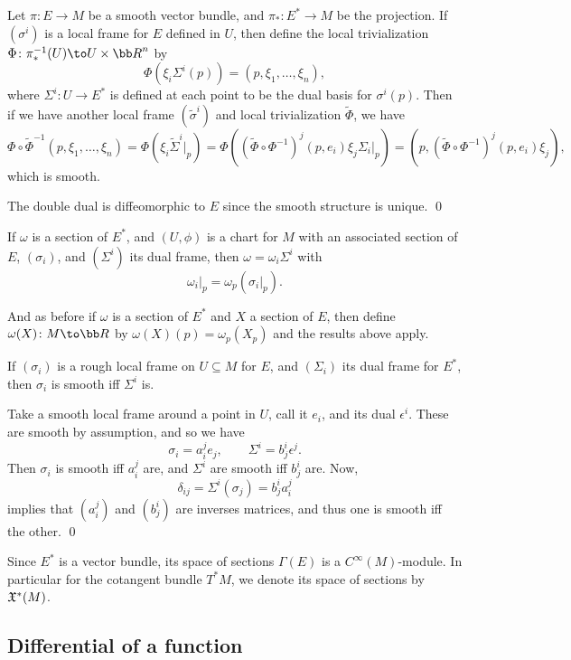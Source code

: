     Let $\pi\colon E\to M$ be a smooth vector bundle, and $\pi_*\colon E^*\to M$ be the projection.
    If $(\sigma^i)$ is a local frame for $E$ defined in $U$, then define the local trivialization $\Phi\colon\pi_*^{-1}(U)\to U\times\bR^n$ by
    $$ \Phi(\xi_i\Sigma^i(p)) = (p,\xi_1,\dots,\xi_n) , $$
    where $\Sigma^i\colon U\to E^*$ is defined at each point to be the dual basis for $\sigma^i(p)$.
    Then if we have another local frame $(\tilde\sigma^i)$ and local trivialization $\tilde\Phi$, we have
    $$ \Phi\circ\tilde\Phi^{-1}(p,\xi_1,\dots,\xi_n) = \Phi(\xi_i\tilde\Sigma^i|_p) = \Phi((\tilde\Phi\circ\Phi^{-1})^j(p,e_i)\xi_j\Sigma_i|_p) = (p,(\tilde\Phi\circ\Phi^{-1})^j(p,e_i)\xi_j) , $$
    which is smooth.

    The double dual is diffeomorphic to $E$ since the smooth structure is unique.
    \qed

\eproof

If $\omega$ is a section of $E^*$, and $(U,\phi)$ is a chart for $M$ with an associated section of $E$, $(\sigma_i)$, and $(\Sigma^i)$ its dual frame, then $\omega=\omega_i\Sigma^i$ with
$$ \omega_i|_p = \omega_p(\sigma_i|_p) . $$

And as before if $\omega$ is a section of $E^*$ and $X$ a section of $E$, then define $\omega(X)\colon M\to\bR$ by $\omega(X)(p)=\omega_p(X_p)$ and the results above apply.

\bprop

    If $(\sigma_i)$ is a rough local frame on $U\subseteq M$ for $E$, and $(\Sigma_i)$ its dual frame for $E^*$, then $\sigma_i$ is smooth iff $\Sigma^i$ is.

\eprop

\bproof

    Take a smooth local frame around a point in $U$, call it $e_i$, and its dual $\epsilon^i$.
    These are smooth by assumption, and so we have
    $$ \sigma_i = a^j_ie_j,\qquad \Sigma^i = b^i_j\epsilon^j . $$
    Then $\sigma_i$ is smooth iff $a^j_i$ are, and $\Sigma^i$ are smooth iff $b^i_j$ are.
    Now,
    $$ \delta_{ij} = \Sigma^i(\sigma_j) = b^i_ja^j_i $$
    implies that $(a^j_i)$ and $(b^i_j)$ are inverses matrices, and thus one is smooth iff the other.
    \qed

\eproof

Since $E^*$ is a vector bundle, its space of sections $\Gamma(E)$ is a $C^\infty(M)$-module.
In particular for the cotangent bundle $T^*M$, we denote its space of sections by ${\frak X}^*(M)$.

\subsection{Differential of a function}

